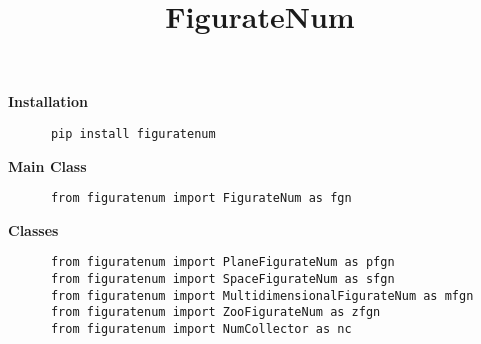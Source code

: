 \documentclass{article}
\title{\textbf{FigurateNum}}
\author{}
\date{}
\begin{document}
\begin{tcolorbox}[leftrule=2mm, rightrule=2mm, bottomrule=0mm, toprule=2mm ]
  \maketitle
  \vspace{-4.5em}
  \begin{multicols}{2}
    \begin{tcolorbox}[leftrule=2mm,  colframe=teal, colback=teal!12]
      \textbf{\large Installation}
      \begin{lstlisting}
      pip install figuratenum
      \end{lstlisting}
    \end{tcolorbox}
    \begin{tcolorbox}[leftrule=2mm,  colframe=teal, colback=teal!12]
      \textbf{\large Main Class}
      \begin{lstlisting}
      from figuratenum import FigurateNum as fgn
      \end{lstlisting}
    \end{tcolorbox}
    \begin{tcolorbox}[leftrule=2mm,  colframe=teal, colback=teal!12]
      \textbf{\large Classes}
      \begin{lstlisting}
      from figuratenum import PlaneFigurateNum as pfgn
      from figuratenum import SpaceFigurateNum as sfgn
      from figuratenum import MultidimensionalFigurateNum as mfgn
      from figuratenum import ZooFigurateNum as zfgn
      from figuratenum import NumCollector as nc
      \end{lstlisting}
    \end{tcolorbox}
  \end{multicols}
\end{tcolorbox}

\thispagestyle{fancy}
\end{document}
